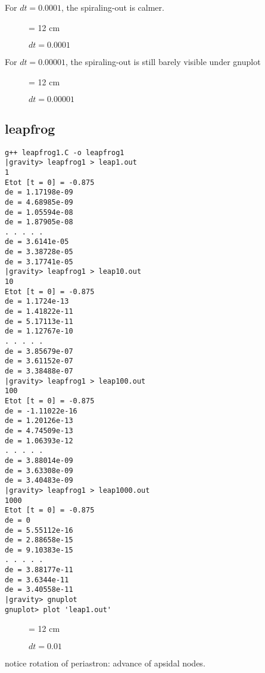 For $dt = 0.0001$, the spiraling-out is calmer.

\begin{figure}
\begin{center}
\leavevmode
\epsfxsize = 12 cm
\caption{$dt = 0.0001$}
\label{fig:for100}
\end{center}
\end{figure}

For $dt = 0.00001$, the spiraling-out is still barely visible under gnuplot

\begin{figure}
\begin{center}
\leavevmode
\epsfxsize = 12 cm
\caption{$dt = 0.00001$}
\label{fig:for1000}
\end{center}
\end{figure}

\subsection{leapfrog}



\begin{verbatim}
g++ leapfrog1.C -o leapfrog1
|gravity> leapfrog1 > leap1.out
1
Etot [t = 0] = -0.875
de = 1.17198e-09
de = 4.68985e-09
de = 1.05594e-08
de = 1.87905e-08
. . . . .
de = 3.6141e-05
de = 3.38728e-05
de = 3.17741e-05
|gravity> leapfrog1 > leap10.out
10
Etot [t = 0] = -0.875
de = 1.1724e-13
de = 1.41822e-11
de = 5.17113e-11
de = 1.12767e-10
. . . . .
de = 3.85679e-07
de = 3.61152e-07
de = 3.38488e-07
|gravity> leapfrog1 > leap100.out
100
Etot [t = 0] = -0.875
de = -1.11022e-16
de = 1.20126e-13
de = 4.74509e-13
de = 1.06393e-12
. . . . .
de = 3.88014e-09
de = 3.63308e-09
de = 3.40483e-09
|gravity> leapfrog1 > leap1000.out
1000
Etot [t = 0] = -0.875
de = 0
de = 5.55112e-16
de = 2.88658e-15
de = 9.10383e-15
. . . . .
de = 3.88177e-11
de = 3.6344e-11
de = 3.40558e-11
|gravity> gnuplot
gnuplot> plot 'leap1.out'
\end{verbatim}

\begin{figure}
\begin{center}
\leavevmode
\epsfxsize = 12 cm
\caption{$dt = 0.01$}
\label{fig:leap1}
\end{center}
\end{figure}

notice rotation of periastron: advance of apsidal nodes.

